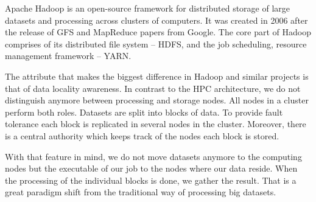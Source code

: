 Apache Hadoop is an open-source framework for distributed storage of
large datasets and processing across clusters of computers. It was
created in 2006 after the release of GFS
\cite{Ghemawat:2003:GFS:1165389.945450} and MapReduce
\cite{Dean:2004:MSD:1251254.1251264} papers from Google. The core part
of Hadoop comprises of its distributed file system -- HDFS, and the
job scheduling, resource management framework -- YARN.

The attribute that makes the biggest difference in Hadoop and similar
projects is that of data locality awareness. In contrast to the HPC
architecture, we do not distinguish anymore between processing and
storage nodes. All nodes in a cluster perform both roles. Datasets are
split into blocks of data. To provide fault tolerance each block is
replicated in several nodes in the cluster. Moreover, there is a
central authority which keeps track of the nodes each block is stored.

With that feature in mind, we do not move datasets anymore to the
computing nodes but the executable of our job to the nodes where our
data reside. When the processing of the individual blocks is done, we
gather the result. That is a great paradigm shift from the traditional way
of processing big datasets.